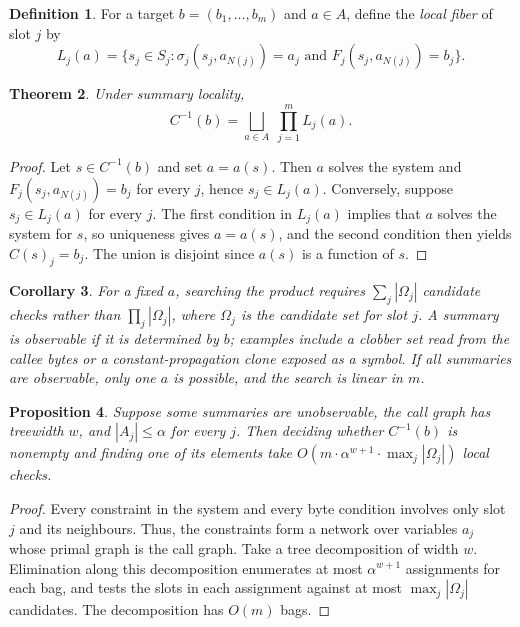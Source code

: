 \documentclass[11pt]{article}
\newtheorem{theorem}{Theorem}[section]
\newtheorem{proposition}[theorem]{Proposition}
\newtheorem{corollary}[theorem]{Corollary}
\theoremstyle{definition}
\newtheorem{definition}[theorem]{Definition}
\theoremstyle{remark}
\begin{document}
\begin{definition}
For a target $b = (b_1, \dots, b_m)$ and $a \in A$, define the \emph{local fiber} of slot $j$ by
\[
  L_j(a) = \{ s_j \in S_j : \sigma_j(s_j, a_{N(j)}) = a_j \text{ and } F_j(s_j, a_{N(j)}) = b_j \}.
\]
\end{definition}

\begin{theorem}\label{thm:tu-product}
Under summary locality,
\[
  C^{-1}(b) = \bigsqcup_{a \in A} \; \prod_{j=1}^m L_j(a).
\]
\end{theorem}

\begin{proof}
Let $s \in C^{-1}(b)$ and set $a = a(s)$. Then $a$ solves the system and $F_j(s_j, a_{N(j)}) = b_j$ for every $j$, hence $s_j \in L_j(a)$. Conversely, suppose $s_j \in L_j(a)$ for every $j$. The first condition in $L_j(a)$ implies that $a$ solves the system for $s$, so uniqueness gives $a = a(s)$, and the second condition then yields $C(s)_j = b_j$. The union is disjoint since $a(s)$ is a function of $s$.
\end{proof}

\begin{corollary}
For a fixed $a$, searching the product requires $\sum_j |\Omega_j|$ candidate checks rather than $\prod_j |\Omega_j|$, where $\Omega_j$ is the candidate set for slot $j$. A summary is \emph{observable} if it is determined by $b$; examples include a clobber set read from the callee bytes or a constant-propagation clone exposed as a symbol. If all summaries are observable, only one $a$ is possible, and the search is linear in $m$.
\end{corollary}

\begin{proposition}
Suppose some summaries are unobservable, the call graph has treewidth $w$, and $|A_j| \le \alpha$ for every $j$. Then deciding whether $C^{-1}(b)$ is nonempty and finding one of its elements take $O(m \cdot \alpha^{w+1} \cdot \max_j |\Omega_j|)$ local checks.
\end{proposition}

\begin{proof}
Every constraint in the system and every byte condition involves only slot $j$ and its neighbours. Thus, the constraints form a network over variables $a_j$ whose primal graph is the call graph. Take a tree decomposition of width $w$. Elimination along this decomposition enumerates at most $\alpha^{w+1}$ assignments for each bag, and tests the slots in each assignment against at most $\max_j |\Omega_j|$ candidates. The decomposition has $O(m)$ bags.
\end{proof}
\end{document}
